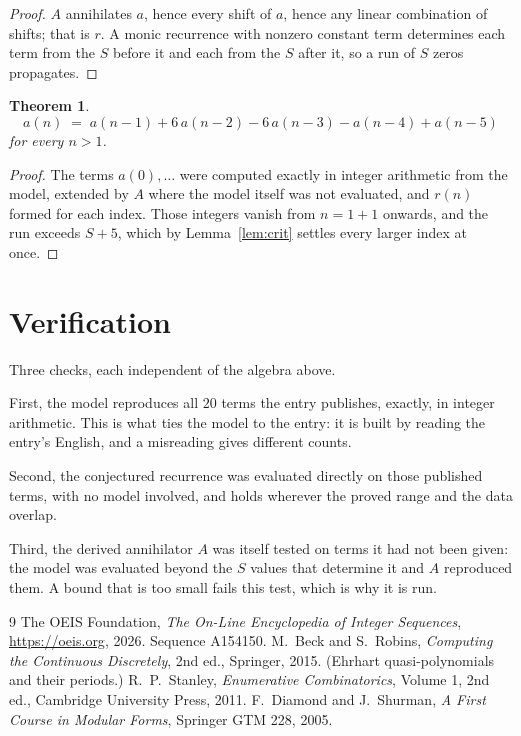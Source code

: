 \documentclass[11pt,a4paper]{article}
\theoremstyle{plain}
\newtheorem{theorem}{Theorem}
\theoremstyle{definition}
\begin{document}
\begin{proof}
$A$ annihilates $a$, hence every shift of $a$, hence any linear combination of shifts; that is
$r$. A monic recurrence with nonzero constant term determines each term from the $S$ before it
and each from the $S$ after it, so a run of $S$ zeros propagates.
\end{proof}

\begin{theorem}
\[
a(n)\;=\;a(n-1) + 6\,a(n-2) - 6\,a(n-3) - a(n-4) + a(n-5)
\]
for every $n>1$.
\end{theorem}

\begin{proof}
The terms $a(0),\dots$ were computed exactly in integer arithmetic from the model, extended by
$A$ where the model itself was not evaluated, and $r(n)$ formed for each index. Those integers
vanish from $n=1+1$ onwards, and the run exceeds $S+5$, which by
Lemma~\ref{lem:crit} settles every larger index at once.
\end{proof}

\section{Verification}

Three checks, each independent of the algebra above.

First, the model reproduces all $20$ terms the entry publishes, exactly, in integer
arithmetic. This is what ties the model to the entry: it is built by reading the entry's
English, and a misreading gives different counts.

Second, the conjectured recurrence was evaluated directly on those published terms, with no
model involved, and holds wherever the proved range and the data overlap.

Third, the derived annihilator $A$ was itself tested on terms it had not been given: the model
was evaluated beyond the $S$ values that determine it and $A$ reproduced them. A bound that is
too small fails this test, which is why it is run.

\begin{thebibliography}{9}
 The OEIS Foundation, \emph{The On-Line Encyclopedia of Integer
Sequences}, \url{https://oeis.org}, 2026. Sequence A154150.
 M.~Beck and S.~Robins, \emph{Computing the Continuous Discretely},
2nd ed., Springer, 2015. (Ehrhart quasi-polynomials and their periods.)
 R.~P.~Stanley, \emph{Enumerative Combinatorics}, Volume 1, 2nd ed.,
Cambridge University Press, 2011.
 F.~Diamond and J.~Shurman, \emph{A First Course in Modular Forms},
Springer GTM 228, 2005.
\end{thebibliography}
\end{document}
